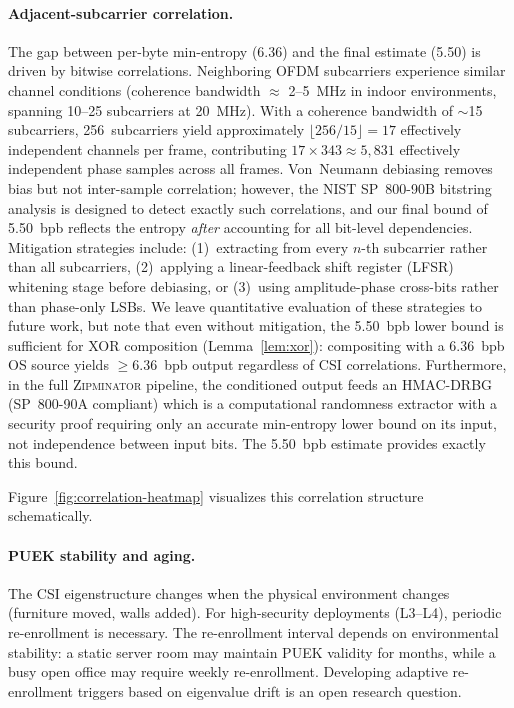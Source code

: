 \documentclass[sigconf,nonacm=false]{acmart}
\newcommand{\zipminator}{\textsc{Zipminator}\xspace}
\begin{document}
\paragraph{Adjacent-subcarrier correlation.}
The gap between per-byte min-entropy (6.36) and the final estimate (5.50) is driven by bitwise correlations.
Neighboring OFDM subcarriers experience similar channel conditions (coherence bandwidth $\approx$ 2--5~MHz in indoor environments, spanning 10--25 subcarriers at 20~MHz).
With a coherence bandwidth of $\sim$15 subcarriers, 256~subcarriers yield approximately $\lfloor 256/15 \rfloor = 17$ effectively independent channels per frame, contributing $17 \times 343 \approx 5{,}831$ effectively independent phase samples across all frames.
Von~Neumann debiasing removes bias but not inter-sample correlation; however, the NIST SP~800-90B bitstring analysis is designed to detect exactly such correlations, and our final bound of 5.50~bpb reflects the entropy \emph{after} accounting for all bit-level dependencies.
Mitigation strategies include: (1)~extracting from every $n$-th subcarrier rather than all subcarriers, (2)~applying a linear-feedback shift register (LFSR) whitening stage before debiasing, or (3)~using amplitude-phase cross-bits rather than phase-only LSBs.
We leave quantitative evaluation of these strategies to future work, but note that even without mitigation, the 5.50~bpb lower bound is sufficient for XOR composition (Lemma~\ref{lem:xor}): compositing with a 6.36~bpb OS source yields $\geq$6.36~bpb output regardless of CSI correlations.
Furthermore, in the full \zipminator pipeline, the conditioned output feeds an HMAC-DRBG (SP~800-90A compliant) which is a computational randomness extractor with a security proof requiring only an accurate min-entropy lower bound on its input, not independence between input bits.
The 5.50~bpb estimate provides exactly this bound.

Figure~\ref{fig:correlation-heatmap} visualizes this correlation structure schematically.



\paragraph{PUEK stability and aging.}
The CSI eigenstructure changes when the physical environment changes (furniture moved, walls added).
For high-security deployments (L3--L4), periodic re-enrollment is necessary.
The re-enrollment interval depends on environmental stability: a static server room may maintain PUEK validity for months, while a busy open office may require weekly re-enrollment.
Developing adaptive re-enrollment triggers based on eigenvalue drift is an open research question.
\end{document}
